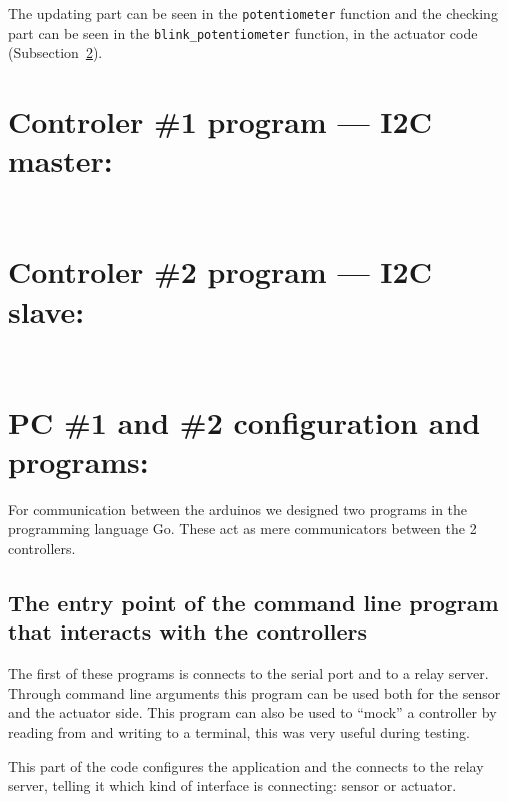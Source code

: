 \documentclass[10pt]{article}
\begin{document}
The updating part can be seen in the \texttt{potentiometer} function and the
checking part can be seen in the \texttt{blink\_potentiometer} function, in the
actuator code (Subsection~\ref{ss:actuatorcode}).

\section{Controler \#1 program --- I2C master:}\label{ss:sensorcode}

\inputminted{cpp}{../arduino/sensor/sensor.hpp}

\inputminted[firstline=2]{cpp}{../arduino/sensor/sensor.ino}


\section{Controler \#2 program --- I2C slave:}\label{ss:actuatorcode}

\inputminted{cpp}{../arduino/actuators/actuators.hpp}

\inputminted[firstline=2]{cpp}{../arduino/actuators/actuators.ino}


\section{PC \#1 and \#2 configuration and programs:}

For communication between the arduinos we designed two programs in the
programming language Go. These act as mere communicators between the 2
controllers.

\subsection{The entry point of the command line program that interacts with the
controllers}

The first of these programs is connects to the serial port and to a relay
server. Through command line arguments this program can be used both for the
sensor and the actuator side. This program can also be used to ``mock'' a
controller by reading from and writing to a terminal, this was very useful
during testing.

This part of the code configures the application and the connects to the relay
server, telling it which kind of interface is connecting: sensor or actuator.

\inputminted[obeytabs=true,tabsize=2]{go}{../communication/serial_interface/main.go}
\end{document}
